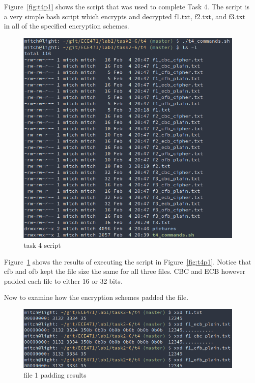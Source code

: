 \documentclass[12pt]{article}
\begin{document}
Figure~\ref{fig:t4p1} shows the script that was used to complete Task 4. The script is a very simple
bash script which encrypts and decrypted f1.txt, f2.txt, and f3.txt in all of the specified encryption
schemes.

\begin{figure}[H]
    \begin{center}
        \includegraphics[scale=0.55]{t4p2.png}
    \end{center}{}
    \caption{task 4 script}
    \label{fig:t4p2}
\end{figure}

Figure~\ref{fig:t4p2} shows the results of executing the script in Figure~\ref{fig:t4p1}. Notice that
cfb and ofb kept the file size the same for all three files. CBC and ECB however padded each file  to
either 16 or 32 bits.

Now to examine how the encryption schemes padded the file.

\begin{figure}[H]
    \begin{center}
        \includegraphics[scale=0.62]{t4p3.png}
    \end{center}{}
    \caption{file 1 padding results}
    \label{fig:t4p3}
\end{figure}
\end{document}
